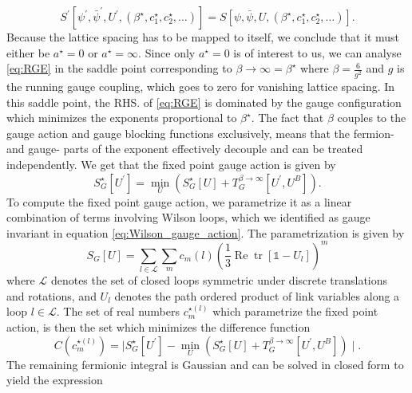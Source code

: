 \documentclass[a4paper,10pt]{article}
\begin{document}
\begin{equation}
S^{\prime}\left[ \psi^{\prime}, \bar{\psi}^{\prime}, U^{\prime}, (\beta^{\star},c_1^{\star},c_2^{\star},\ldots) \right] = S\left[ \psi, \bar{\psi}, U, (\beta^{\star},c_1^{\star},c_2^{\star},\ldots) \right].
\end{equation}
Because the lattice spacing has to be mapped to itself, we conclude that it must either be $a^\star = 0$ or $a^\star = \infty$. Since only $a^\star = 0$ is of interest to us, we can analyse \eqref{eq:RGE} in the saddle point corresponding to $\beta\rightarrow \infty = \beta^\star$ where $\beta = \frac{6}{g^2}$ and $g$ is the running gauge coupling, which goes to zero for vanishing lattice spacing. In this saddle point, the RHS. of \eqref{eq:RGE} is dominated by the gauge configuration which minimizes the exponents proportional to $\beta^\star$. The fact that $\beta$ couples to the gauge action and gauge blocking functions exclusively, means that the fermion- and gauge- parts of the exponent effectively decouple and can be treated independently. We get that the fixed point gauge action is given by
\begin{equation}
S_{G}^{\star}\left[U^{\prime}\right]=\min _{U}\left(S_{G}^{\star}[U]+T_{G}^{\beta\rightarrow\infty}\left[U^{\prime}, U^{B}\right]\right).
\end{equation}
To compute the fixed point gauge action, we parametrize it as a linear combination of terms involving Wilson loops, which we identified as gauge invariant in equation \eqref{eq:Wilson_gauge_action}. The parametrization is given by
\begin{equation}\label{eq:Wilson_parametrized}
S_{G}[U]=\sum_{l \in \mathcal{L}} \sum_{m} c_{m}(l)\left(\frac{1}{3} \operatorname{Re} \operatorname{tr}\left[\mathbb{1}-U_{l}\right]\right)^{m}
\end{equation}
where $\mathcal{L}$ denotes the set of closed loops symmetric under discrete translations and rotations, and $U_l$ denotes the path ordered product of link variables along a loop $l\in\mathcal{L}$. The set of real numbers $c_m^{\star(l)}$ which parametrize the fixed point action, is then the set which minimizes the difference function 
\begin{equation}
C(c_m^{\star(l)})= \mid S_{G}^{\star}\left[U^{\prime}\right]-\min _{U}\left(S_{G}^{\star}[U]+T_{G}^{\beta\rightarrow\infty}\left[U^{\prime}, U^{B}\right]\right)\mid.
\end{equation}
The remaining fermionic integral is Gaussian and can be solved in closed form to yield the expression 
\end{document}
